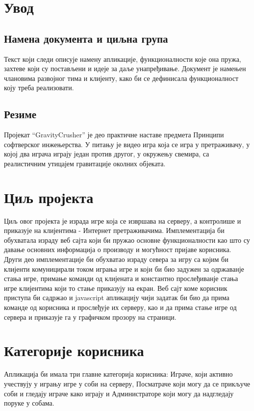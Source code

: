 \section{Увод}

\subsection{Намена документа и циљна група}
Текст који следи описује намену апликације, функционалности које она пружа, захтеве који су постављени и идеје за даље унапређивање. Документ је намењен члановима развојног тима и клијенту, како би се дефинисала функционалност коју треба  реализовати.

\subsection{Резиме}
Пројекат “GravityCrusher” је део практичне наставе предмета Принципи софтверског инжењерства. У питању је видео игра која се игра у претраживачу, у којој два играча играју један против другог, у окружењу свемира, са реалистичним утицајем гравитације околних објеката.

\section{Циљ пројекта}
Циљ овог пројекта је израда игре која се извршава на серверу, а контролише и приказује на клијентима - Интернет претраживачима. Имплементација би обухватала израду веб сајта који би пружао основне функционалности као што су давање основних информација о производу и могућност пријаве корисника. Други део имплементације би обухватао израду севера за игру са којим би клијенти комуницирали током играња игре и који би био задужен за одржаванје стања игре, примање команди од клијената и константно прослеђиванје стања игре клијентима који то стање приказују на екран. Веб сајт коме корисник приступа би садржао и javascript апликацију чији задатак би био да прима команде од корисника и прослеђује их серверу, као и да прима стање игре од сервера и приказује га у графичком прозору на страници.

\section{Категорије корисника}
Апликација би имала три главне категорија корисника: Играче, који активно учествују у игрању игре у соби на серверу, Посматраче који могу да се прикључе соби и гледају играче како играју и Администраторе који могу да надгледају поруке у собама.

